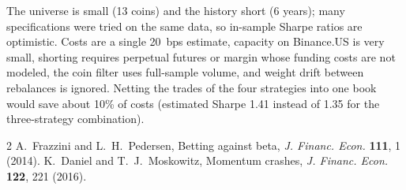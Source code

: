 \documentclass[aps,prl,onecolumn,superscriptaddress,nofootinbib]{revtex4-2}
\begin{document}
	The universe is small (13 coins) and the history short (6 years); many specifications were tried on the same data, so in-sample Sharpe ratios are optimistic. Costs are a single 20~bps estimate, capacity on Binance.US is very small, shorting requires perpetual futures or margin whose funding costs are not modeled, the coin filter uses full-sample volume, and weight drift between rebalances is ignored. Netting the trades of the four strategies into one book would save about 10\% of costs (estimated Sharpe 1.41 instead of 1.35 for the three-strategy combination).
	
	\begin{thebibliography}{2}
		 A.~Frazzini and L.~H.~Pedersen, Betting against beta, \textit{J. Financ. Econ.} \textbf{111}, 1 (2014).
		 K.~Daniel and T.~J.~Moskowitz, Momentum crashes, \textit{J. Financ. Econ.} \textbf{122}, 221 (2016).
	\end{thebibliography}
	
\end{document}
